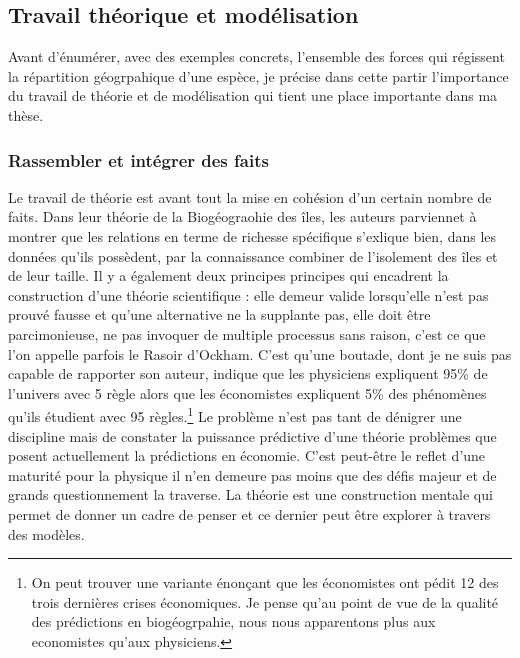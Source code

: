 \subsection*{Travail théorique et
modélisation}\label{travail-thuxe9orique-et-moduxe9lisation}

Avant d'énumérer, avec des exemples concrets, l'ensemble des forces qui
régissent la répartition géogrpahique d'une espèce, je précise dans
cette partir l'importance du travail de théorie et de modélisation qui
tient une place importante dans ma thèse.

\subsubsection*{Rassembler et intégrer des
faits}\label{rassembler-et-intuxe9grer-des-faits}

Le travail de théorie est avant tout la mise en cohésion d'un certain
nombre de faits. Dans leur théorie de la Biogéograohie des îles, les
auteurs parviennet à montrer que les relations en terme de richesse
spécifique s'exlique bien, dans les données qu'ils possèdent, par la
connaissance combiner de l'isolement des îles et de leur taille. Il y a
également deux principes principes qui encadrent la construction d'une
théorie scientifique : elle demeur valide lorsqu'elle n'est pas prouvé
fausse et qu'une alternative ne la supplante pas, elle doit être
parcimonieuse, ne pas invoquer de multiple processus sans raison, c'est
ce que l'on appelle parfois le Rasoir d'Ockham. C'est qu'une boutade,
dont je ne suis pas capable de rapporter son auteur, indique que les
physiciens expliquent 95\% de l'univers avec 5 règle alors que les
économistes expliquent 5\% des phénomènes qu'ils étudient avec 95
règles.\footnote{On peut trouver une variante énonçant que les
  économistes ont pédit 12 des trois dernières crises économiques. Je
  pense qu'au point de vue de la qualité des prédictions en
  biogéogrpahie, nous nous apparentons plus aux economistes qu'aux
  physiciens.} Le problème n'est pas tant de dénigrer une discipline
mais de constater la puissance prédictive d'une théorie problèmes que
posent actuellement la prédictions en économie. C'est peut-être le
reflet d'une maturité pour la physique il n'en demeure pas moins que des
défis majeur et de grands questionnement la traverse. La théorie est une
construction mentale qui permet de donner un cadre de penser et ce
dernier peut être explorer à travers des modèles.

